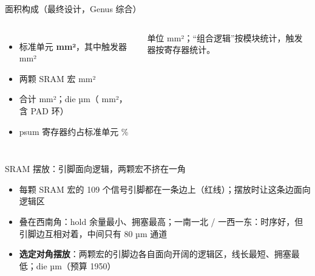 \documentclass[10pt,aspectratio=169,hyperref={colorlinks,urlcolor=peking_blue,linkcolor=}]{beamer}
\newcommand{\hl}[1]{\textcolor{peking}{\textbf{#1}}}
\newcommand{\snote}[1]{{\footnotesize\color{peking_gray}#1}}
\begin{document}
\begin{frame}{面积构成（最终设计，Genus 综合）}
  \begin{columns}[c]
    \begin{itemize}\small
      \item 标准单元 \hl{\NStdArea{} mm²}，其中触发器 \NFlopArea{} mm²
      \item 两颗 SRAM 宏 \NSramArea{} mm²
      \item 合计 \NTotalArea{} mm²；die \NDieSide{} µm（\NDieArea{} mm²，含 PAD 环）
      \item psum 寄存器约占标准单元 \NPsumShare\%
    \end{itemize}
    \snote{单位 mm²；“组合逻辑”按模块统计，触发器按寄存器统计。}
  \end{columns}
\end{frame}

\begin{frame}{SRAM 摆放：引脚面向逻辑，两颗宏不挤在一角}
  \centering
  \begin{tikzpicture}
    
  \end{tikzpicture}
  \vspace{2pt}

  \begin{itemize}\small
    \item 每颗 SRAM 宏的 109 个信号引脚都在一条边上（红线）；摆放时让这条边面向逻辑区
    \item 叠在西南角：hold 余量最小、拥塞最高；一南一北 / 一西一东：时序好，但引脚边互相对着，中间只有 80 µm 通道
    \item \hl{选定对角摆放}：两颗宏的引脚边各自面向开阔的逻辑区，线长最短、拥塞最低；die \NDieSide{} µm（预算 1950）
  \end{itemize}
\end{frame}
\end{document}
